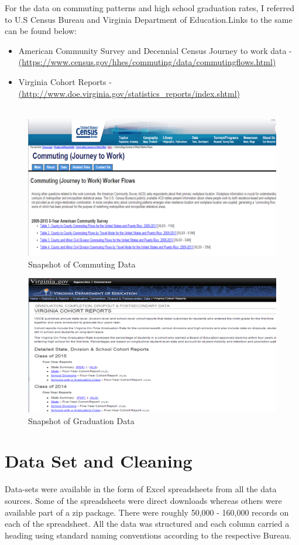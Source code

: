 \documentclass[12pt]{article}
\begin{document}
For the data on commuting patterns and high school graduation rates, I referred to U.S Census Bureau and Virginia Department of Education.Links to the same can be found below: 
\begin{itemize}
\item American Community Survey and Decennial Census Journey to work data  - \url{(https://www.census.gov/hhes/commuting/data/commutingflows.html)}  
\item Virginia Cohort Reports - \url{(http://www.doe.virginia.gov/statistics_reports/index.shtml)} \\\\
\end{itemize}
\begin{figure}[htp]
\centering
\includegraphics[scale = 0.35]{COMM.png}
\caption{Snapshot of Commuting Data}
\label{highq}
\end{figure}
\begin{figure}[htp]
\centering
\includegraphics[scale = 0.35]{GRAD.png}
\caption{Snapshot of Graduation Data}
\label{highq}
\end{figure}
\newpage

\section{Data Set and Cleaning}
Data-sets were available in the form of Excel spreadsheets from all the data sources. Some of the spreadsheets were direct downloads whereas others were available part of a zip package. There were roughly 50,000 - 160,000 records on each of the spreadsheet. All the data was structured and each column carried a heading using standard naming conventions according to the respective Bureau.
\end{document}
